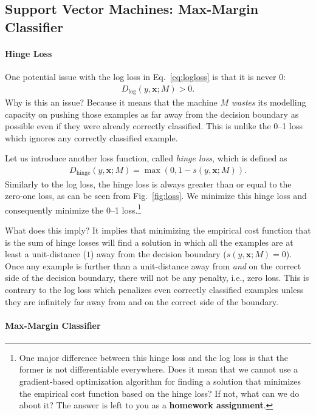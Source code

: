 \documentclass{report}
\newcommand{\vect}[1]{\mathbf{#1}}
\newcommand{\vx}[0]{\vect{x}}
\newcommand{\hinge}{\text{hinge}}
\begin{document}
\subsection{Support Vector Machines: Max-Margin Classifier}

\paragraph{Hinge Loss}

One potential issue with the log loss in Eq.~\eqref{eq:logloss} is that it is
never $0$: 
\begin{align*}
    D_{\log}(y, \vx; M) > 0.
\end{align*}
Why is this an issue? Because it means that the machine $M$ {\it wastes} its
modelling capacity on pushing those examples as far away from the decision
boundary as possible even if they were already correctly classified. This is
unlike the 0--1 loss which ignores any correctly classified example. 

Let us introduce another loss function, called {\it hinge loss}, which is
defined as
\begin{align*}
    D_{\hinge}(y, \vx; M) = \max(0, 1 - s(y, \vx; M)).
\end{align*}
Similarly to the log loss, the hinge loss is always greater than or equal to the
zero-one loss, as can be seen from Fig.~\ref{fig:loss}. We minimize this hinge
loss and consequently minimize the 0--1 loss.\footnote{
    One major difference between this hinge loss and the log loss is that the
    former is not differentiable everywhere. Does it mean that we cannot use a
    gradient-based optimization algorithm for finding a solution that minimizes
    the empirical cost function based on the hinge loss? If not, what can we do
    about it? The answer is left to you as a {\bf homework assignment}.
}

What does this imply? It implies that minimizing the empirical cost function
that is the sum of hinge losses will find a solution in which all the examples
are at least a unit-distance ($1$) away from the decision boundary ($s(y, \vx;
M) = 0$). Once any example is further than a unit-distance away from  {\it and}
on the correct side of the decision boundary, there will not be any penalty, i.e.,
zero loss. This is contrary to the log loss which penalizes even correctly
classified examples unless they are infinitely far away from and on the correct
side of the boundary.

\paragraph{Max-Margin Classifier}
\end{document}
